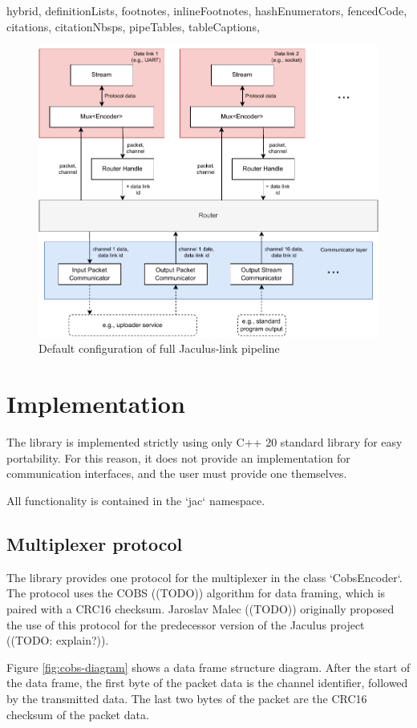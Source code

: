 \begin{markdown*}{%
  hybrid,
  definitionLists,
  footnotes,
  inlineFootnotes,
  hashEnumerators,
  fencedCode,
  citations,
  citationNbsps,
  pipeTables,
  tableCaptions,
}
\begin{figure}[ht]
    \centering
    \includegraphics[width=\textwidth]{img/link-pipeline}
    \caption{Default configuration of full Jaculus-link pipeline}
    \label{fig:link-pipeline}
\end{figure}


\section{Implementation}

The library is implemented strictly using only C++ 20 standard library for easy portability. For this reason, it does not provide an implementation for communication interfaces, and the user must provide one themselves.

All functionality is contained in the `jac` namespace.

\subsection{Multiplexer protocol}

The library provides one protocol for the multiplexer in the class `CobsEncoder`. The protocol uses the COBS ((TODO)) algorithm for data framing, which is paired with a CRC16 checksum. Jaroslav Malec ((TODO)) originally proposed the use of this protocol for the predecessor version of the Jaculus project ((TODO: explain?)).

Figure \ref{fig:cobs-diagram} shows a data frame structure diagram. After the start of the data frame, the first byte of the packet data is the channel identifier, followed by the transmitted data. The last two bytes of the packet are the CRC16 checksum of the packet data.


\end{markdown*}
